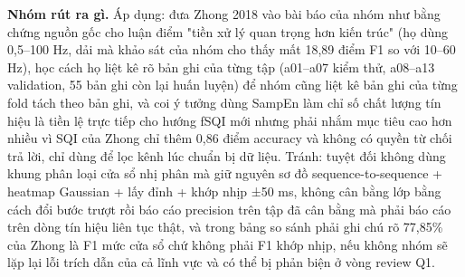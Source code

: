 \documentclass[12pt,a4paper]{article}
\begin{document}
\noindent \textbf{\color{tdtblue}Nhóm rút ra gì.} Áp dụng: đưa Zhong 2018 vào bài báo của nhóm như bằng chứng nguồn gốc cho luận điểm "tiền xử lý quan trọng hơn kiến trúc" (họ dùng 0,5–100 Hz, dải mà khảo sát của nhóm cho thấy mất 18,89 điểm F1 so với 10–60 Hz), học cách họ liệt kê rõ bản ghi của từng tập (a01–a07 kiểm thử, a08–a13 validation, 55 bản ghi còn lại huấn luyện) để nhóm cũng liệt kê bản ghi của từng fold tách theo bản ghi, và coi ý tưởng dùng SampEn làm chỉ số chất lượng tín hiệu là tiền lệ trực tiếp cho hướng fSQI mới nhưng phải nhắm mục tiêu cao hơn nhiều vì SQI của Zhong chỉ thêm 0,86 điểm accuracy và không có quyền từ chối trả lời, chỉ dùng để lọc kênh lúc chuẩn bị dữ liệu. Tránh: tuyệt đối không dùng khung phân loại cửa sổ nhị phân mà giữ nguyên sơ đồ sequence-to-sequence + heatmap Gaussian + lấy đỉnh + khớp nhịp ±50 ms, không cân bằng lớp bằng cách đổi bước trượt rồi báo cáo precision trên tập đã cân bằng mà phải báo cáo trên dòng tín hiệu liên tục thật, và trong bảng so sánh phải ghi chú rõ 77,85\% của Zhong là F1 mức cửa sổ chứ không phải F1 khớp nhịp, nếu không nhóm sẽ lặp lại lỗi trích dẫn của cả lĩnh vực và có thể bị phản biện ở vòng review Q1.\par\vspace{3pt}
\vspace{6pt}
\end{document}
